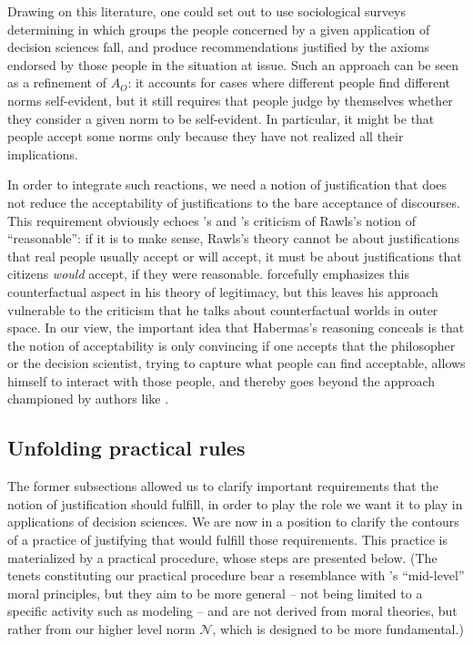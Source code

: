 \documentclass[preprint, french, english, 11pt, authoryear]{elsarticle}%
\newcommand{\possessivecite}[1]{\citeauthor{#1}’s \citeyearpar{#1}}
\begin{document}
Drawing on this literature, one could set out to use sociological surveys determining in which groups the people concerned by a given application of decision sciences fall, and produce recommendations justified by the axioms endorsed by those people in the situation at issue. 
Such an approach can be seen as a refinement of $A_O$: it accounts for cases where different people find different norms self-evident, but it still requires that people judge by themselves whether they consider a given norm to be self-evident. 
In particular, it might be that people accept some norms only because they have not realized all their implications.

In order to integrate such reactions, we need a notion of justification that does not reduce the acceptability of justifications to the bare acceptance of discourses. 
This requirement obviously echoes \citeauthor{habermas_reconciliation_1995}’s and \citeauthor{estlund_democratic_2009}’s criticism of Rawls's notion of “reasonable”: 
if it is to make sense, Rawls's theory cannot be about justifications that real people usually accept or will accept, it must be about justifications that citizens \emph{would} accept, if they were reasonable. 
\citet{habermas_faktizitat_1992} forcefully emphasizes this counterfactual aspect in his theory of legitimacy, but this leaves his approach vulnerable to the criticism that he talks about counterfactual worlds in outer space. 
In our view, the important idea that Habermas's reasoning conceals is that the notion of acceptability is only convincing if one accepts that the philosopher or the decision scientist, trying to capture what people can find acceptable, 
allows himself to interact with those people, and thereby goes beyond the approach championed by authors like \cite{boltanski_justification_2006}.

\subsection{Unfolding practical rules}
The former subsections allowed us to clarify important requirements that the notion of justification should fulfill, in order to play the role we want it to play in applications of decision sciences. 
We are now in a position to clarify the contours of a practice of justifying that would fulfill those requirements. This practice is materialized by a practical procedure, whose steps are presented below. 
(The tenets constituting our practical procedure bear a resemblance with \possessivecite{diekmann_moral_2013} ``mid-level'' moral principles, but they aim to be more general -- not being limited to a specific activity such as modeling -- 
and are not derived from moral theories, but rather from our higher level norm $\mathscr{N}$, which is designed to be more fundamental.)
\end{document}
